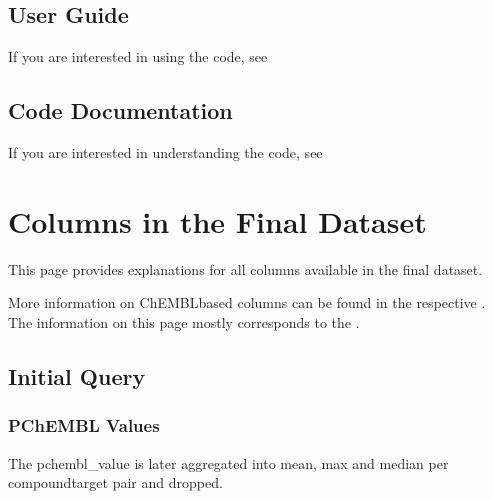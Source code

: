 \documentclass[letterpaper,10pt,english]{sphinxmanual}
\begin{document}
\section{User Guide}
\label{\detokenize{introduction:user-guide}}
\sphinxAtStartPar
If you are interested in using the code, see {\hyperref[\detokenize{user_guide::doc}]{}}


\section{Code Documentation}
\label{\detokenize{introduction:code-documentation}}
\sphinxAtStartPar
If you are interested in understanding the code, see {\hyperref[\detokenize{modules::doc}]{}}

\sphinxstepscope


\chapter{Columns in the Final Dataset}
\label{\detokenize{columns_docs:columns-in-the-final-dataset}}\label{\detokenize{columns_docs::doc}}
\sphinxAtStartPar
This page provides explanations for all columns available in the final dataset.

\sphinxAtStartPar
More information on ChEMBL\sphinxhyphen{}based columns can be found in the respective .
The information on this page mostly corresponds to the .


\section{Initial Query}
\label{\detokenize{columns_docs:initial-query}}

\subsection{PChEMBL Values}
\label{\detokenize{columns_docs:pchembl-values}}
\sphinxAtStartPar
The pchembl\_value is later aggregated into mean, max and median per compound\sphinxhyphen{}target pair and dropped.
\end{document}
